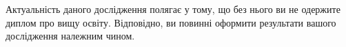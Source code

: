 Актуальність даного дослідження полягає 
у тому, що без нього ви не одержите диплом про вищу освіту. Відповідно, ви повинні 
оформити результати вашого дослідження належним чином.

